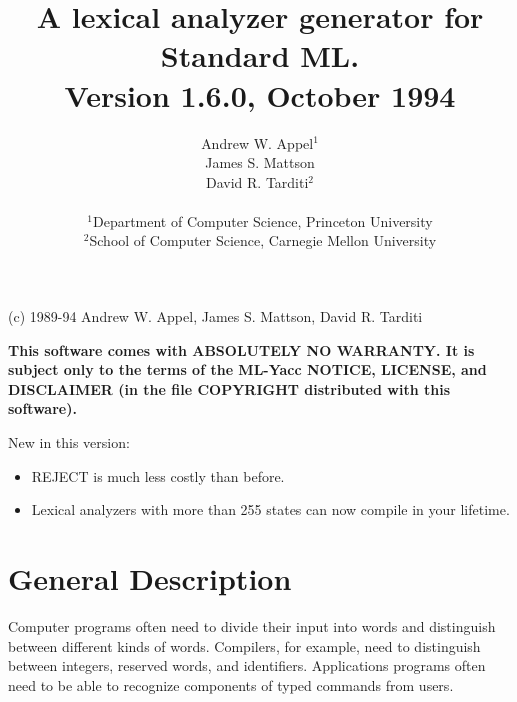 %
%
\title{        A lexical analyzer generator for Standard ML.\\
                               Version 1.6.0, October 1994
      }
\author{                    Andrew W. Appel$^1$\\
                            James S. Mattson\\
                            David R. Tarditi$^2$\\
\\
\small
$^1$Department of Computer Science, Princeton University \\
\small
$^2$School of Computer Science, Carnegie Mellon University
}
\date{}

\maketitle
\begin{center}
(c) 1989-94 Andrew W. Appel, James S. Mattson, David R. Tarditi
\end{center}

{\bf
This software comes with ABSOLUTELY NO WARRANTY.  It is subject only to
the terms of the ML-Yacc NOTICE, LICENSE, and DISCLAIMER (in the
file COPYRIGHT distributed with this software).
}

\vspace{1in}

New in this version:
\begin{itemize}
\item REJECT is much less costly than before.
\item Lexical analyzers with more than 255 states can now compile in your
lifetime.
\end{itemize}

\newpage
\tableofcontents
\newpage

\section{General Description}

Computer programs often need to divide their input into words and
distinguish between different kinds of words.  Compilers, for
example, need to distinguish between integers, reserved words, and
identifiers.  Applications programs often need to be able to
recognize components of typed commands from users.

